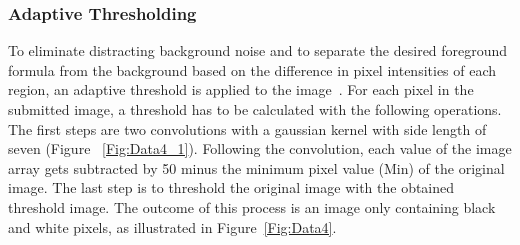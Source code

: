 \documentclass[@CLASSOPTIONS@]{tumarticle}
\begin{document}
\subsubsection{Adaptive Thresholding}

To eliminate distracting background noise and to separate the desired foreground formula
from the background based on the difference in pixel intensities of each region,
an adaptive threshold is applied to the image~\cite{threshold}.
For each pixel in the submitted image, a threshold has to be calculated with the following operations.
The first steps are two convolutions with a gaussian kernel with side length of seven (Figure ~\ref{Fig:Data4_1}).
Following the convolution, each value of the image array gets subtracted by 50 minus the minimum
pixel value (Min) of the original image.
The last step is to threshold the original image with the obtained threshold image.
The outcome of this process is an image only containing black and white pixels, as illustrated in Figure~\ref{Fig:Data4}.
\end{document}
